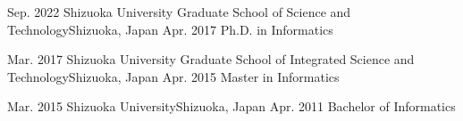 \begin{educations}
\education
    {Sep. 2022} {Shizuoka University Graduate School of Science and Technology}{Shizuoka, Japan}{}
    {Apr. 2017} {Ph.D. in Informatics}
    
 \emptySeparator
  \education
    {Mar. 2017} {Shizuoka University Graduate School of Integrated Science and Technology}{Shizuoka, Japan}{}
    {Apr. 2015} {Master in Informatics}

  \emptySeparator
  \education
    {Mar. 2015} {Shizuoka University}{Shizuoka, Japan}{}
    {Apr. 2011} {Bachelor of Informatics}
\end{educations}
\vspace{-3mm}